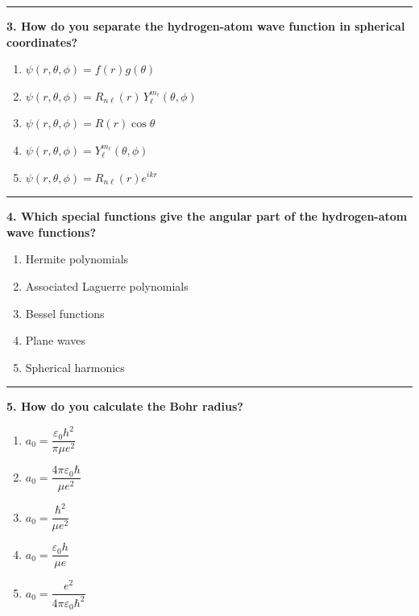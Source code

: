\documentclass[
  english,
  9pt,
]{extbook}
\providecommand{\tightlist}{%
  \setlength{\itemsep}{0pt}\setlength{\parskip}{0pt}}
\theoremstyle{definition}
\theoremstyle{definition}
\theoremstyle{definition}
\theoremstyle{definition}
\theoremstyle{remark}
\begin{document}
\begin{center}\rule{0.5\linewidth}{0.5pt}\end{center}

\textbf{3. How do you separate the hydrogen-atom wave function in spherical coordinates?}

\begin{enumerate}
\def\labelenumi{\alph{enumi}.}
\tightlist
\item
  \(\psi(r,\theta,\phi) = f(r) g(\theta)\)\\
\item
  \(\psi(r,\theta,\phi) = R_{n\ell}(r)\,Y_\ell^{m_\ell}(\theta,\phi)\)
\item
  \(\psi(r,\theta,\phi) = R(r) \cos\theta\)\\
\item
  \(\psi(r,\theta,\phi) = Y_\ell^{m_\ell}(\theta,\phi)\)\\
\item
  \(\psi(r,\theta,\phi) = R_{n\ell}(r) e^{i k r}\)
\end{enumerate}

\begin{center}\rule{0.5\linewidth}{0.5pt}\end{center}

\textbf{4. Which special functions give the angular part of the hydrogen-atom wave functions?}

\begin{enumerate}
\def\labelenumi{\alph{enumi}.}
\tightlist
\item
  Hermite polynomials\\
\item
  Associated Laguerre polynomials\\
\item
  Bessel functions\\
\item
  Plane waves\\
\item
  Spherical harmonics
\end{enumerate}

\begin{center}\rule{0.5\linewidth}{0.5pt}\end{center}

\textbf{5. How do you calculate the Bohr radius?}

\begin{enumerate}
\def\labelenumi{\alph{enumi}.}
\tightlist
\item
  \(a_0 = \dfrac{\varepsilon_0 h^2}{\pi \mu e^2}\)\\
\item
  \(a_0 = \dfrac{4\pi \varepsilon_0 \hbar}{\mu e^2}\)\\
\item
  \(a_0 = \dfrac{\hbar^2}{\mu e^2}\)\\
\item
  \(a_0 = \dfrac{\varepsilon_0 h}{\mu e}\)\\
\item
  \(a_0 = \dfrac{e^2}{4\pi \varepsilon_0 \hbar^2}\)
\end{enumerate}
\end{document}
